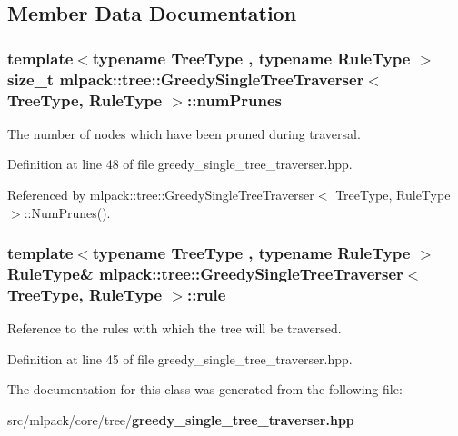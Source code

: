 \subsection{Member Data Documentation}
\subsubsection[{num\+Prunes}]{\setlength{\rightskip}{0pt plus 5cm}template$<$typename Tree\+Type , typename Rule\+Type $>$ size\+\_\+t {\bf mlpack\+::tree\+::\+Greedy\+Single\+Tree\+Traverser}$<$ Tree\+Type, Rule\+Type $>$\+::num\+Prunes\hspace{0.3cm}{\ttfamily [private]}}\label{classmlpack_1_1tree_1_1GreedySingleTreeTraverser_a36e110d5f5b961a739f4d1349d2a8647}


The number of nodes which have been pruned during traversal. 



Definition at line 48 of file greedy\+\_\+single\+\_\+tree\+\_\+traverser.\+hpp.



Referenced by mlpack\+::tree\+::\+Greedy\+Single\+Tree\+Traverser$<$ Tree\+Type, Rule\+Type $>$\+::\+Num\+Prunes().

\subsubsection[{rule}]{\setlength{\rightskip}{0pt plus 5cm}template$<$typename Tree\+Type , typename Rule\+Type $>$ Rule\+Type\& {\bf mlpack\+::tree\+::\+Greedy\+Single\+Tree\+Traverser}$<$ Tree\+Type, Rule\+Type $>$\+::rule\hspace{0.3cm}{\ttfamily [private]}}\label{classmlpack_1_1tree_1_1GreedySingleTreeTraverser_a2cdb92ca2c4e8f385a7c2e5fd1a7cb3d}


Reference to the rules with which the tree will be traversed. 



Definition at line 45 of file greedy\+\_\+single\+\_\+tree\+\_\+traverser.\+hpp.



The documentation for this class was generated from the following file\+:\begin{DoxyCompactItemize}
\item 
src/mlpack/core/tree/{\bf greedy\+\_\+single\+\_\+tree\+\_\+traverser.\+hpp}\end{DoxyCompactItemize}
